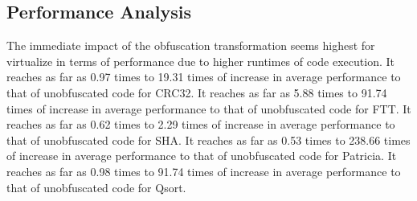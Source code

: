 \subsection{Performance Analysis}
The immediate impact of the obfuscation transformation seems highest for virtualize in terms of performance due to higher runtimes of code execution. 
It reaches as far as 0.97 times to 19.31 times of increase in average performance to that of unobfuscated code for CRC32. 
It reaches as far as 5.88 times to 91.74 times of increase in average performance to that of unobfuscated code for FTT. 
It reaches as far as 0.62 times to 2.29 times of increase in average performance to that of unobfuscated code for SHA. 
It reaches as far as 0.53 times to 238.66 times of increase in average performance to that of unobfuscated code for Patricia. 
It reaches as far as 0.98 times to 91.74 times of increase in average performance to that of unobfuscated code for Qsort. 
